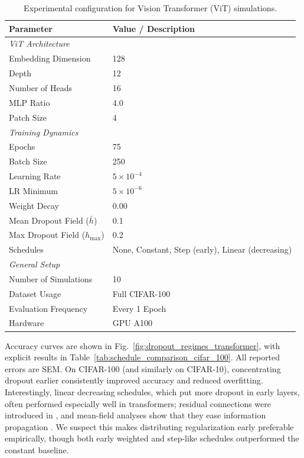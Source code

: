 \documentclass{article}
\theoremstyle{plain}
\theoremstyle{definition}
\theoremstyle{remark}
\begin{document}
\begin{table}[h]
 \caption{Experimental configuration for Vision Transformer (ViT) simulations.}
 \label{tab:vit_config}
 \centering
 \footnotesize
 \setlength{\tabcolsep}{3pt}
 \renewcommand{\arraystretch}{0.9}
 \begin{tabular}{l l}
 \toprule
 \textbf{Parameter} & \textbf{Value / Description} \\
 \midrule
 \multicolumn{2}{l}{\textit{ViT Architecture}} \\
 \midrule
 Embedding Dimension & 128 \\
 Depth & 12 \\
 Number of Heads & 16 \\
 MLP Ratio & 4.0 \\
 Patch Size & 4 \\
 \midrule
 \multicolumn{2}{l}{\textit{Training Dynamics}} \\
 \midrule
 Epochs & 75 \\
 Batch Size & 250 \\
 Learning Rate & $5 \times 10^{-4}$ \\
 LR Minimum & $5 \times 10^{-6}$ \\
 Weight Decay & 0.00 \\
 Mean Dropout Field ($\bar{h}$) & 0.1 \\
 Max Dropout Field ($h_{\max}$) & 0.2 \\
 Schedules & None, Constant, Step (early), Linear (decreasing) \\
 \midrule
 \multicolumn{2}{l}{\textit{General Setup}} \\
 \midrule
 Number of Simulations & 10 \\
 Dataset Usage & Full CIFAR-100 \\
 Evaluation Frequency & Every 1 Epoch \\
 Hardware & GPU A100 \\
 \bottomrule
 \end{tabular}
\end{table}

Accuracy curves are shown in Fig.~\ref{fig:dropout_regimes_transformer}, with explicit results in Table~\ref{tab:schedule_comparison_cifar_100}. All reported errors are SEM. On CIFAR-100 (and similarly on CIFAR-10), concentrating dropout earlier consistently improved accuracy and reduced overfitting. Interestingly, linear decreasing schedules, which put more dropout in early layers, often performed especially well in transformers; residual connections were introduced in \cite{he2016resnet}, and mean-field analyses show that they ease information propagation \cite{yang2017meanfieldresnets}. We suspect this makes distributing regularization early preferable empirically, though both early weighted and step-like schedules outperformed the constant baseline.
\end{document}
